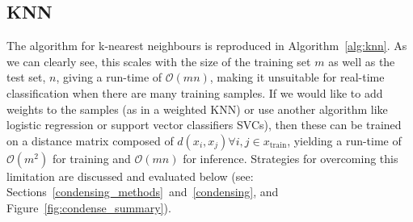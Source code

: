 \documentclass[conference]{IEEEtran}
\newcommand{\cm}[1]{\textit{{\color{blue}#1}}}
\begin{document}

\subsection{KNN}
\label{runtime}
The algorithm for k-nearest neighbours is reproduced in Algorithm~\ref{alg:knn}. As we can clearly see, this scales with the size of the training set $m$ as well as the test set, $n$, giving a run-time of $\mathcal{O}(mn)$, making it unsuitable for real-time classification when there are many training samples. If we would like to add weights to the samples (as in a weighted KNN) or use another algorithm like logistic regression or support vector classifiers SVCs), then these can be trained on a distance matrix composed of $d(x_i, x_j) \forall i,j \in x_{\text{train}}$, yielding a run-time of $\mathcal{O}(m^2)$ for training and $\mathcal{O}(mn)$ for inference. Strategies for overcoming this limitation are discussed and evaluated below (see: Sections~\ref{condensing_methods}~and~\ref{condensing}, and Figure~\ref{fig:condense_summary}). 
\end{document}
